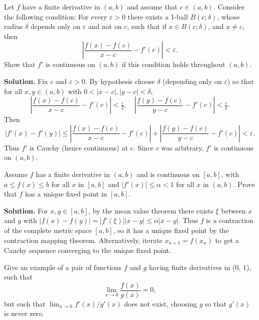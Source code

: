 \begin{problembox}
Let \( f \) have a finite derivative in \( (a, b) \) and assume that \( c \in (a, b) \). Consider the following condition: For every \( \varepsilon > 0 \) there exists a 1-ball \( B(c; \delta) \), whose radius \( \delta \) depends only on \( \varepsilon \) and not on \( c \), such that if \( x \in B(c; \delta) \), and \( x \neq c \), then
\[ \left| \frac{f(x) - f(c)}{x - c} - f'(c) \right| < \varepsilon. \]
Show that \( f' \) is continuous on \( (a, b) \) if this condition holds throughout \( (a, b) \).
\end{problembox}

\noindent\textbf{Solution.}
Fix $c$ and $\varepsilon>0$. By hypothesis choose $\delta$ (depending only on $\varepsilon$) so that for all $x,y\in(a,b)$ with $0<|x-c|,|y-c|<\delta$,
\[\left|\frac{f(x)-f(c)}{x-c}-f'(c)\right|<\tfrac\varepsilon2,\quad \left|\frac{f(y)-f(c)}{y-c}-f'(c)\right|<\tfrac\varepsilon2.\]
Then
\[|f'(x)-f'(y)|\le \left|\frac{f(x)-f(c)}{x-c}-f'(c)\right|+\left|\frac{f(y)-f(c)}{y-c}-f'(c)\right|<\varepsilon.\]
Thus $f'$ is Cauchy (hence continuous) at $c$. Since $c$ was arbitrary, $f'$ is continuous on $(a,b)$.

\begin{problembox}
Assume \( f \) has a finite derivative in \( (a, b) \) and is continuous on \( [a, b] \), with \( a \leq f(x) \leq b \) for all \( x \) in \( [a, b] \) and \( |f'(x)| \leq \alpha < 1 \) for all \( x \) in \( (a, b) \). Prove that \( f \) has a unique fixed point in \( [a, b] \).
\end{problembox}

\noindent\textbf{Solution.}
For $x,y\in[a,b]$, by the mean value theorem there exists $\xi$ between $x$ and $y$ with $|f(x)-f(y)|=|f'(\xi)||x-y|\le \alpha|x-y|$. Thus $f$ is a contraction of the complete metric space $[a,b]$, so it has a unique fixed point by the contraction mapping theorem. Alternatively, iterate $x_{n+1}=f(x_n)$ to get a Cauchy sequence converging to the unique fixed point.

\begin{problembox}
Give an example of a pair of functions \( f \) and \( g \) having finite derivatives in (0, 1), such that
\[ \lim_{x \to 0} \frac{f(x)}{g(x)} = 0, \]
but such that \( \lim_{x \to 0} f'(x)/g'(x) \) does not exist, choosing \( g \) so that \( g'(x) \) is never zero.
\end{problembox}

